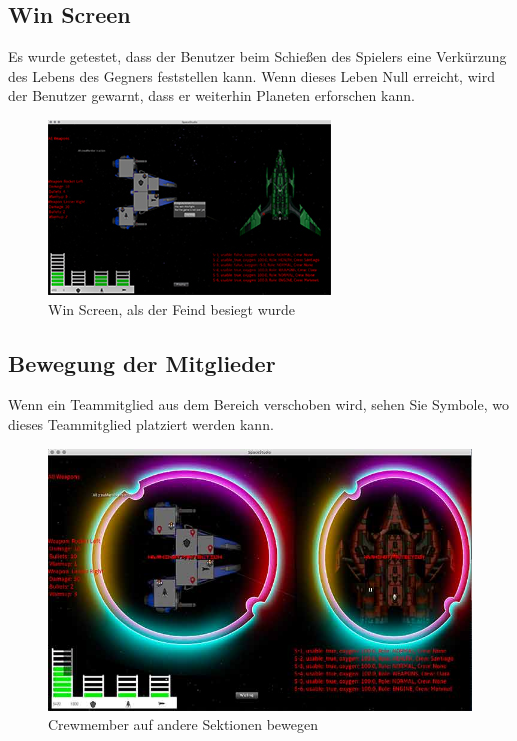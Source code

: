 \documentclass[12pt]{article}
\begin{document}
\newpage
\subsection{Win Screen}
Es wurde getestet, dass der Benutzer beim Schießen des Spielers eine Verkürzung des Lebens des Gegners feststellen kann. Wenn dieses Leben Null erreicht, wird der Benutzer gewarnt, dass er weiterhin Planeten erforschen kann.
\begin{figure}[htp]
\centering
\includegraphics[scale=1.2]{TestProtocolBilder/wonScreen.jpg}
\caption{Win Screen, als der Feind besiegt wurde }
\end{figure}
\newpage
\subsection{Bewegung der Mitglieder}
Wenn ein Teammitglied aus dem Bereich verschoben wird, sehen Sie Symbole, wo dieses Teammitglied platziert werden kann.
\begin{figure}[htp]
\centering
\includegraphics[scale=0.6]{TestProtocolBilder/crewmemberpull@0,25x.jpg}
\caption{Crewmember auf andere Sektionen bewegen}
\end{figure}
\newpage
\end{document}
